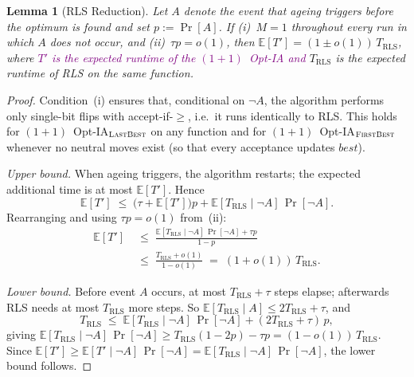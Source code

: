 \documentclass[lettersize,journal]{IEEEtran}
\newcommand{\rerev}[1]{\textcolor{purple}{#1}}
\newcommand{\EE}{\mathbb{E}}
\newcommand{\oneoneOPTIA}{$(1+1)$~Opt-IA}
\newcommand{\firstBest}{$(1+1)$~Opt-IA$_{\textsc{FirstBest}}$}
\newcommand{\lastBest}{$(1+1)$~Opt-IA$_{\textsc{LastBest}}$}
\newtheorem{lemma}{Lemma}
\begin{document}
\begin{lemma}[RLS Reduction]\label{lem:RLS-reduction}
Let $A$ denote the event that ageing triggers before the optimum is found
and set $p:=\Pr[A]$.
If \emph{(i)}~$M=1$ throughout every run in which $A$ does not occur, and
\emph{(ii)}~$\tau p=o(1)$,
then $\EE[T']=(1\pm o(1))\,T_{\mathrm{RLS}}$,
where \rerev{$T'$ is the expected runtime of the \oneoneOPTIA{} and} $T_{\mathrm{RLS}}$ is the expected runtime of RLS
 on the same function.
\end{lemma}

\begin{proof}
Condition~(i) ensures that, conditional on $\lnot A$, the algorithm performs
only single-bit flips with accept-if-$\geq$, i.e.\ it runs identically to RLS.
This holds for \lastBest{} on any function and for \firstBest{} whenever
no neutral moves exist (so that every acceptance updates $\mathit{best}$).

\textit{Upper bound.}
When ageing triggers, the algorithm restarts; the expected additional time is
at most $\EE[T']$.  Hence
\[
  \EE[T'] \;\leq\;
    \bigl(\tau + \EE[T']\bigr)p
    + \EE[T_{\mathrm{RLS}}\mid\lnot A]\,\Pr[\lnot A].
\]
Rearranging and using $\tau p=o(1)$ from~(ii):
\begin{align*}
  \EE[T'] &\;\leq\;
  \frac{\EE[T_{\mathrm{RLS}}\mid\lnot A]\,\Pr[\lnot A]+\tau p}{1-p}\\
 & \;\leq\;
  \frac{T_{\mathrm{RLS}}+o(1)}{1-o(1)}
  \;=\; (1+o(1))\,T_{\mathrm{RLS}}.
\end{align*}

\textit{Lower bound.}
Before event $A$ occurs, at most $T_{\mathrm{RLS}}+\tau$ steps elapse;
afterwards RLS needs at most $T_{\mathrm{RLS}}$ more steps.  So
$\EE[T_{\mathrm{RLS}}\mid A]\leq 2T_{\mathrm{RLS}}+\tau$, and
\[
  T_{\mathrm{RLS}} \;\leq\;
    \EE[T_{\mathrm{RLS}}\mid\lnot A]\,\Pr[\lnot A]
    + (2T_{\mathrm{RLS}}+\tau)\,p,
\]
giving $\EE[T_{\mathrm{RLS}}\mid\lnot A]\,\Pr[\lnot A]
\geq T_{\mathrm{RLS}}(1-2p)-\tau p=(1-o(1))\,T_{\mathrm{RLS}}$.
Since $\EE[T']\geq\EE[T'\mid\lnot A]\,\Pr[\lnot A]
=\EE[T_{\mathrm{RLS}}\mid\lnot A]\,\Pr[\lnot A]$, the lower bound
follows.
\end{proof}
\end{document}
